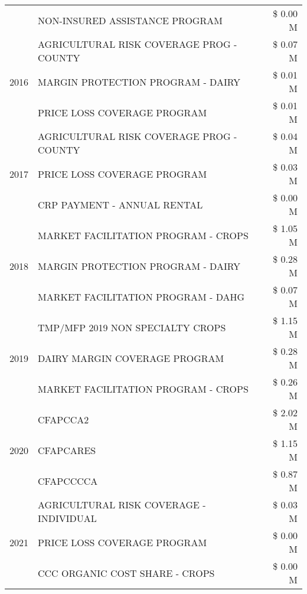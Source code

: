 \begin{tabular}{llr}
 & NON-INSURED ASSISTANCE PROGRAM & \$ 0.00 M \\
\cline{1-3}
\multirow[t]{3}{*}{2016} & AGRICULTURAL RISK COVERAGE PROG - COUNTY & \$ 0.07 M \\
 & MARGIN PROTECTION PROGRAM - DAIRY & \$ 0.01 M \\
 & PRICE LOSS COVERAGE PROGRAM & \$ 0.01 M \\
\cline{1-3}
\multirow[t]{3}{*}{2017} & AGRICULTURAL RISK COVERAGE PROG - COUNTY & \$ 0.04 M \\
 & PRICE LOSS COVERAGE PROGRAM & \$ 0.03 M \\
 & CRP PAYMENT - ANNUAL RENTAL & \$ 0.00 M \\
\cline{1-3}
\multirow[t]{3}{*}{2018} & MARKET FACILITATION PROGRAM - CROPS & \$ 1.05 M \\
 & MARGIN PROTECTION PROGRAM - DAIRY & \$ 0.28 M \\
 & MARKET FACILITATION PROGRAM - DAHG & \$ 0.07 M \\
\cline{1-3}
\multirow[t]{3}{*}{2019} & TMP/MFP 2019 NON SPECIALTY CROPS & \$ 1.15 M \\
 & DAIRY MARGIN COVERAGE PROGRAM & \$ 0.28 M \\
 & MARKET FACILITATION PROGRAM - CROPS & \$ 0.26 M \\
\cline{1-3}
\multirow[t]{3}{*}{2020} & CFAPCCA2 & \$ 2.02 M \\
 & CFAPCARES & \$ 1.15 M \\
 & CFAPCCCCA & \$ 0.87 M \\
\cline{1-3}
\multirow[t]{3}{*}{2021} & AGRICULTURAL RISK COVERAGE - INDIVIDUAL & \$ 0.03 M \\
 & PRICE LOSS COVERAGE PROGRAM & \$ 0.00 M \\
 & CCC ORGANIC COST SHARE - CROPS & \$ 0.00 M \\
\cline{1-3}
\bottomrule
\end{tabular}
